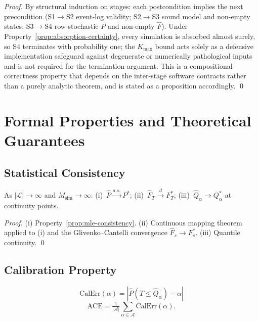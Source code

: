 \begin{proof}
By structural induction on stages: each postcondition implies the next
precondition (S1$\to$S2 event-log validity; S2$\to$S3 sound model and
non-empty states; S3$\to$S4 row-stochastic $P$ and non-empty $\hat{F}$).
Under Property~\ref{prop:absorption-certainty}, every simulation is absorbed
almost surely, so S4 terminates with probability one; the $K_{\max}$ bound
acts solely as a defensive implementation safeguard against degenerate or
numerically pathological inputs and is not required for the termination
argument. This is a compositional-correctness property that depends on the
inter-stage software contracts rather than a purely analytic theorem, and is
stated as a proposition accordingly.
\qed
\end{proof}


\section{Formal Properties and Theoretical Guarantees}
\label{sec:method-properties}

\subsection{Statistical Consistency}
\label{sec:prop-consistency}

\begin{theorem}
\label{thm:consistency}
As $|\mathcal{L}| \to \infty$ and $M_{\text{sim}} \to \infty$:
(i)~$\hat{P} \xrightarrow{a.s.} P^*$;
(ii)~$\hat{F}_T \xrightarrow{d} F_T^*$;
(iii)~$\hat{Q}_\alpha \to Q_\alpha^*$ at continuity points.
\end{theorem}

\begin{proof}
(i) Property~\ref{prop:mle-consistency}.
(ii) Continuous mapping theorem applied to (i) and the Glivenko–Cantelli
convergence $\hat{F}_s \to F_s^*$.
(iii) Quantile continuity. \qed
\end{proof}


\subsection{Calibration Property}
\label{sec:prop-calibration}

\begin{definition}
\label{def:calibration}
\begin{equation}
\label{eq:calibration}
\text{CalErr}(\alpha) = |\hat{P}(T \leq \hat{Q}_\alpha) - \alpha|
\end{equation}
\begin{equation}
\label{eq:aggregate-calibration}
\text{ACE} = \tfrac{1}{|\mathcal{A}|} \sum_{\alpha \in \mathcal{A}}
    \text{CalErr}(\alpha).
\end{equation}
\end{definition}

